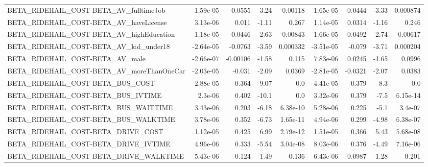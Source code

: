\begin{tabular}{lrrrrrrrr}
BETA\_RIDEHAIL\_COST-BETA\_AV\_fulltimeJob             &   -1.59e-05 &      -0.0555 &    -3.24 &  0.00118 &  -1.65e-05 &     -0.0444 &        -3.33 &      0.000874 \\
BETA\_RIDEHAIL\_COST-BETA\_AV\_haveLicense             &    3.13e-06 &        0.011 &    -1.11 &    0.267 &   1.14e-05 &      0.0314 &        -1.16 &         0.246 \\
BETA\_RIDEHAIL\_COST-BETA\_AV\_highEducation           &   -1.18e-05 &      -0.0446 &    -2.63 &  0.00843 &  -1.66e-05 &     -0.0492 &        -2.74 &       0.00617 \\
BETA\_RIDEHAIL\_COST-BETA\_AV\_kid\_under18             &   -2.64e-05 &      -0.0763 &    -3.59 & 0.000332 &  -3.51e-05 &      -0.079 &        -3.71 &      0.000204 \\
BETA\_RIDEHAIL\_COST-BETA\_AV\_male                    &   -2.66e-07 &     -0.00106 &    -1.58 &    0.115 &   7.83e-06 &      0.0245 &        -1.65 &        0.0996 \\
BETA\_RIDEHAIL\_COST-BETA\_AV\_moreThanOneCar          &   -2.03e-05 &       -0.031 &    -2.09 &   0.0369 &  -2.81e-05 &     -0.0321 &        -2.07 &        0.0383 \\
BETA\_RIDEHAIL\_COST-BETA\_BUS\_COST                   &    2.88e-05 &        0.364 &     9.07 &      0.0 &   4.41e-05 &       0.379 &          8.3 &           0.0 \\
BETA\_RIDEHAIL\_COST-BETA\_BUS\_IVTIME                 &     2.3e-06 &        0.402 &    -10.1 &      0.0 &   3.32e-06 &       0.379 &         -7.5 &      6.15e-14 \\
BETA\_RIDEHAIL\_COST-BETA\_BUS\_WAITTIME               &    3.43e-06 &        0.203 &    -6.18 & 6.38e-10 &   5.28e-06 &       0.225 &         -5.1 &       3.4e-07 \\
BETA\_RIDEHAIL\_COST-BETA\_BUS\_WALKTIME               &    3.78e-06 &        0.352 &    -6.73 & 1.65e-11 &   4.94e-06 &       0.299 &        -4.98 &      6.38e-07 \\
BETA\_RIDEHAIL\_COST-BETA\_DRIVE\_COST                 &    1.12e-05 &        0.425 &     6.99 & 2.79e-12 &   1.51e-05 &       0.366 &         5.43 &      5.68e-08 \\
BETA\_RIDEHAIL\_COST-BETA\_DRIVE\_IVTIME               &    4.96e-06 &        0.333 &    -5.54 & 3.04e-08 &   8.03e-06 &       0.376 &        -4.49 &      7.16e-06 \\
BETA\_RIDEHAIL\_COST-BETA\_DRIVE\_WALKTIME             &    5.43e-06 &        0.124 &    -1.49 &    0.136 &   6.43e-06 &      0.0987 &        -1.28 &         0.201 \\

\end{tabular}
